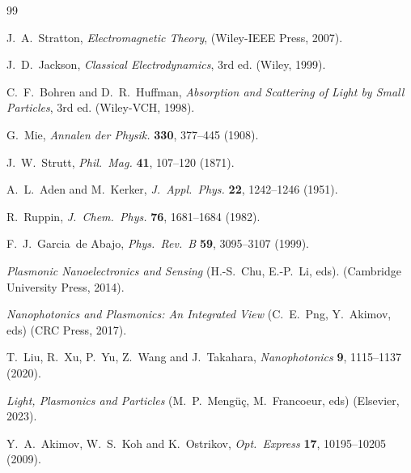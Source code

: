 \documentclass[aps,prb,reprint]{revtex4-2}
\begin{document}
\begin{thebibliography}{99}

J.~A.~Stratton,
{\it Electromagnetic Theory},
(Wiley-IEEE Press, 2007).
  
J.~D.~Jackson,
{\it Classical Electrodynamics}, 3rd ed.
(Wiley, 1999).

C.~F.~Bohren and D.~R.~Huffman, 
{\it Absorption and Scattering of Light by Small Particles}, 3rd ed.
(Wiley-VCH, 1998). 

G.~Mie, 
{\it Annalen der Physik.} {\bf 330}, 377--445 (1908). 

J.~W.~Strutt,
{\it Phil.~Mag.} {\bf 41}, 107--120 (1871).

A.~L.~Aden and M.~Kerker,
{\it J.~Appl.~Phys.} {\bf 22}, 1242--1246 (1951).

R.~Ruppin,
{\it J.~Chem.~Phys.} {\bf 76}, 1681--1684 (1982).

F.~J.~Garcia~de Abajo,
{\it Phys.~Rev.~B} {\bf 59}, 3095--3107 (1999).

{\it Plasmonic Nanoelectronics and Sensing} (H.-S.~Chu, E.-P.~Li, eds).
(Cambridge University Press, 2014).

{\it Nanophotonics and Plasmonics: An Integrated View} (C.~E.~Png, Y.~Akimov, eds)
(CRC Press, 2017).

T.~Liu, R.~Xu, P.~Yu, Z.~Wang and J.~Takahara,
{\it Nanophotonics} {\bf 9}, 1115--1137 (2020).

{\it Light, Plasmonics and Particles} (M.~P.~Meng\"u\c{c}, M.~Francoeur, eds)
(Elsevier, 2023).

Y.~A.~Akimov, W.~S.~Koh and K.~Ostrikov,
{\it Opt.~Express} {\bf 17}, 10195--10205 (2009).


\end{thebibliography}
\end{document}
